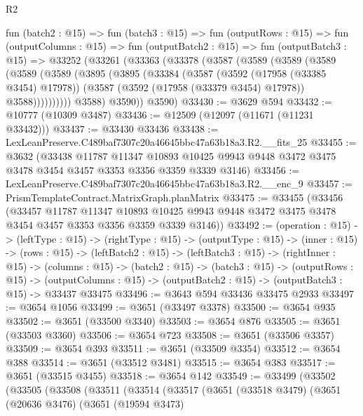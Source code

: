 \begin{lexlean}{R2}
\begin{coremodule}
  fun (batch2 : @15) =>
  fun (batch3 : @15) =>
  fun (outputRows : @15) =>
  fun (outputColumns : @15) =>
  fun (outputBatch2 : @15) =>
  fun (outputBatch3 : @15) =>
  @33252
    (@33261
      (@33363
        (@33378
          (@3587
            (@3589
              (@3589
                (@3589
                  (@3589
                    (@3589
                      (@3895
                        (@3895
                          (@33384
                            (@3587
                              (@3592 (@17958 (@33385 @3454) @17978))
                              (@3587 (@3592 (@17958 (@33379 @3454) @17978)) @3588))))))))))
            @3588)
          @3590))
      @3590)
@33430 := @3629 @594
@33432 := @10777 (@10309 @3487)
@33436 := @12509 (@12097 (@11671 (@11231 @33432)))
@33437 := @33430 @33436
@33438 := LexLeanPreserve.C489baf7307c20a46645bbc47a63b18a3.R2.__fits_25
@33455 := @3632
    (@33438
      @11787
      @11347
      @10893
      @10425
      @9943
      @9448
      @3472
      @3475
      @3478
      @3454
      @3457
      @3353
      @3356
      @3359
      @3339
      @3146)
@33456 := LexLeanPreserve.C489baf7307c20a46645bbc47a63b18a3.R2.__enc_9
@33457 := PrismTemplateContract.MatrixGraph.planMatrix
@33475 := @33455
    (@33456
      (@33457
        @11787
        @11347
        @10893
        @10425
        @9943
        @9448
        @3472
        @3475
        @3478
        @3454
        @3457
        @3353
        @3356
        @3359
        @3339
        @3146))
@33492 := (operation : @15) ->
  (leftType : @15) ->
  (rightType : @15) ->
  (outputType : @15) ->
  (inner : @15) ->
  (rows : @15) ->
  (leftBatch2 : @15) ->
  (leftBatch3 : @15) ->
  (rightInner : @15) ->
  (columns : @15) ->
  (batch2 : @15) ->
  (batch3 : @15) ->
  (outputRows : @15) ->
  (outputColumns : @15) -> (outputBatch2 : @15) -> (outputBatch3 : @15) -> @33437 @33475
@33496 := @3643 @594 @33436 @33475 @2933
@33497 := @3654 @1056
@33499 := @3651 (@33497 @3378)
@33500 := @3654 @935
@33502 := @3651 (@33500 @3340)
@33503 := @3654 @876
@33505 := @3651 (@33503 @3360)
@33506 := @3654 @723
@33508 := @3651 (@33506 @3357)
@33509 := @3654 @393
@33511 := @3651 (@33509 @3354)
@33512 := @3654 @388
@33514 := @3651 (@33512 @3481)
@33515 := @3654 @383
@33517 := @3651 (@33515 @3455)
@33518 := @3654 @142
@33549 := @33499
    (@33502
      (@33505
        (@33508
          (@33511
            (@33514
              (@33517
                (@3651
                  (@33518 @3479)
                  (@3651
                    (@20636 @3476)
                    (@3651
                      (@19594 @3473)

\end{coremodule}
\end{lexlean}

